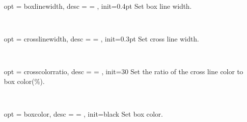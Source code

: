 \documentclass[full]{l3doc}
\begin{document}
\begin{documentation}
\bigskip

\begin{option}{ opt = boxlinewidth, desc = {= }, init=0.4pt }
  Set box line width.
\end{option}\\
\begin{SideBySideExample}[frame=single,numbers=left,xrightmargin=.44\linewidth,gobble=2]
  \centering
  \quad
  \quad
\end{SideBySideExample}

\bigskip

\begin{option}{ opt = crosslinewidth, desc = {= }, init=0.3pt }
  Set cross line width.
\end{option}\\
\begin{SideBySideExample}[frame=single,numbers=left,xrightmargin=.44\linewidth,gobble=2]
  \centering
  \quad
  \quad
\end{SideBySideExample}

\bigskip

\begin{option}{ opt = crosscolorratio, desc = {= }, init=30 }
  Set the ratio of the cross line color to box color(\%).
\end{option}\\
\begin{SideBySideExample}[frame=single,numbers=left,xrightmargin=.38\linewidth,gobble=2]
  \centering
  \quad
\end{SideBySideExample}

\bigskip

\begin{option}{ opt = boxcolor, desc = {= }, init=black }
  Set box color.
\end{option}\\
\begin{SideBySideExample}[frame=single,numbers=left,xrightmargin=.50\linewidth,gobble=2]
  \centering
  \quad
  \quad
\end{SideBySideExample}


\end{documentation}
\end{document}
